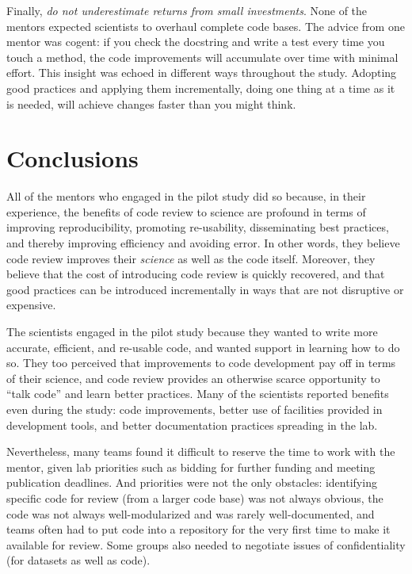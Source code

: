 \documentclass[10pt,twocolumn]{article}
\begin{document}
Finally,
\emph{do not underestimate returns from small investments}.
None of the mentors expected scientists to overhaul complete code bases.
The advice from one mentor was cogent:
if you check the docstring and write a test every time you touch a method,
the code improvements will accumulate over time with minimal effort.
This insight was echoed in different ways throughout the study.
Adopting good practices and applying them incrementally,
doing one thing at a time as it is needed,
will achieve changes faster than you might think.

\section{Conclusions}

All of the mentors who engaged in the pilot study did so because,
in their experience,
the benefits of code review to science are profound in terms of improving reproducibility,
promoting re-usability,
disseminating best practices,
and thereby improving efficiency and avoiding error.
In other words,
they believe code review improves their \emph{science}
as well as the code itself.
Moreover,
they believe that the cost of introducing code review is quickly recovered,
and that good practices can be introduced incrementally in ways that are not disruptive or expensive.

The scientists engaged in the pilot study because they wanted to write more accurate, efficient, and re-usable code,
and wanted support in learning how to do so.
They too perceived that improvements to code development pay off in terms of their science,
and code review provides an otherwise scarce opportunity to ``talk code'' and learn better practices.
Many of the scientists reported benefits even during the study:
code improvements,
better use of facilities provided in development tools,
and better documentation practices spreading in the lab.  

Nevertheless,
many teams found it difficult to reserve the time to work with the mentor,
given lab priorities such as bidding for further funding and meeting publication deadlines.
And priorities were not the only obstacles:
identifying specific code for review (from a larger code base) was not always obvious,
the code was not always well-modularized and was rarely well-documented,
and teams often had to put code into a repository for the very first time to make it available for review.
Some groups also needed to negotiate issues of confidentiality (for datasets as well as code).
\end{document}
